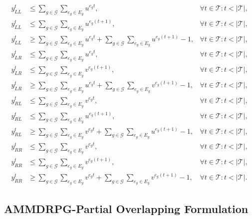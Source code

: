 \documentclass[10pt,a4paper]{elsarticle}
\begin{document}
\begin{align}
y_{LL}^t &\leq \sum_{g\in\mathcal {G}} \sum_{e_g \in E_g} u^{e_g t}, &\forall t\in\mathcal T:t<|\mathcal T|,\label{eq:yLL-1}\\
y_{LL}^t &\leq \sum_{g\in\mathcal {G}} \sum_{e_g \in E_g} u^{e_g (t+1)}, &\forall t\in\mathcal T:t<|\mathcal T|,\\
y_{LL}^t &\geq \sum_{g\in\mathcal {G}} \sum_{e_g \in E_g} u^{e_g t} + \sum_{g\in\mathcal {G}} \sum_{e_g \in E_g} u^{e_g (t+1)} -1, &\forall t\in\mathcal T:t<|\mathcal T|,\\
y_{LR}^t &\leq \sum_{g\in\mathcal {G}} \sum_{e_g \in E_g} u^{e_g t}, &\forall t\in\mathcal T:t<|\mathcal T|,\\
y_{LR}^t &\leq \sum_{g\in\mathcal {G}} \sum_{e_g \in E_g} v^{e_g (t+1)}, &\forall t\in\mathcal T:t<|\mathcal T|,\\
y_{LR}^t &\geq \sum_{g\in\mathcal {G}} \sum_{e_g \in E_g} u^{e_g t} + \sum_{g\in\mathcal {G}} \sum_{e_g \in E_g} v^{e_g (t+1)} -1, &\forall t\in\mathcal T:t<|\mathcal T|,\\
y_{RL}^t &\leq \sum_{g\in\mathcal {G}} \sum_{e_g \in E_g} v^{e_g t}, &\forall t\in\mathcal T:t<|\mathcal T|,\\
y_{RL}^t &\leq \sum_{g\in\mathcal {G}} \sum_{e_g \in E_g} u^{e_g (t+1)}, &\forall t\in\mathcal T:t<|\mathcal T|,\\
y_{RL}^t &\geq \sum_{g\in\mathcal {G}} \sum_{e_g \in E_g} v^{e_g t} +\sum_{g\in\mathcal {G}} \sum_{e_g \in E_g} u^{e_g (t+1)} -1, &\forall t\in\mathcal T:t<|\mathcal T|,\\
y_{RR}^t &\leq \sum_{g\in\mathcal {G}} \sum_{e_g \in E_g} v^{e_g t}, &\forall t\in\mathcal T:t<|\mathcal T|,\\
y_{RR}^t &\leq \sum_{g\in\mathcal {G}} \sum_{e_g \in E_g} v^{e_g (t+1)}, &\forall t\in\mathcal T:t<|\mathcal T|,\\
y_{RR}^t &\geq \sum_{g\in\mathcal {G}} \sum_{e_g \in E_g}v^{e_g t} +\sum_{g\in\mathcal {G}} \sum_{e_g \in E_g} v^{e_g (t+1)} -1,  &\forall t\in\mathcal T:t<|\mathcal T|.\label{eq:yRR-3}
\end{align}

\subsection*{AMMDRPG-Partial Overlapping Formulation}
\end{document}
